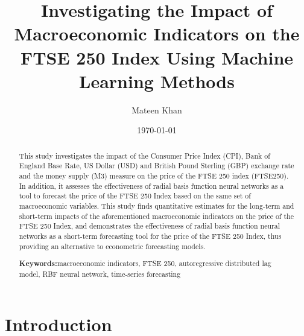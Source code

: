 \documentclass[11pt,a4paper]{article}
\title{Investigating the Impact of Macroeconomic Indicators 
on the FTSE 250 Index Using Machine Learning Methods}
\author{Mateen Khan}
\date{\today}
\providecommand{\keywordname}{\textbf{Keywords:}} %
\newcommand{\keywords}[1]{%
  \par\addvspace{\baselineskip}%
  \noindent\keywordname\enspace\ignorespaces#1 %
}
\begin{document}
\maketitle

\begin{abstract}
    This study investigates the impact of the Consumer Price Index (CPI), Bank of England Base Rate, US Dollar (USD) and British Pound Sterling (GBP) exchange rate and the money supply (M3) measure on the price of the FTSE 250 index (FTSE250).
    In addition, it assesses the effectiveness of radial basis function neural networks as a tool to forecast the price of the FTSE 250 Index based on the same set of macroeconomic variables. This study finds quantitative estimates for the long-term and short-term impacts of the aforementioned macroeconomic indicators on the price of the FTSE 250 Index, and demonstrates the effectiveness of radial basis function neural networks as a short-term forecasting tool for the price of the FTSE 250 Index, thus providing an alternative to econometric forecasting models.

    \keywords{macroeconomic indicators, FTSE 250, autoregressive distributed lag model, RBF neural network, time-series forecasting}
\end{abstract}

\section{Introduction}
\end{document}
